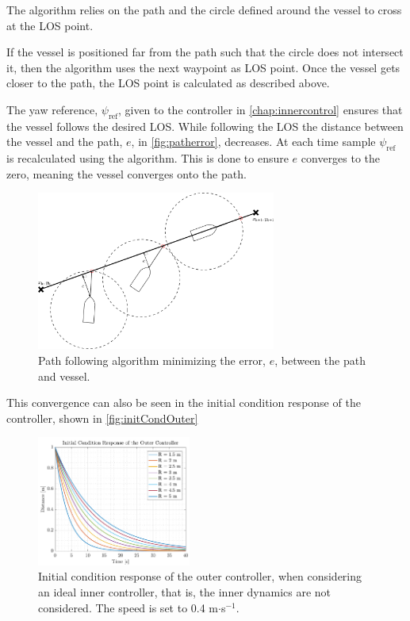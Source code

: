 The algorithm relies on the path and the circle defined around the vessel to cross at the LOS point. 

If the vessel is positioned far from the path such that the circle does not intersect it, then the algorithm uses the next waypoint as LOS point. Once the vessel gets closer to the path, the LOS point is calculated as described above.

The yaw reference, $\psi_\mathrm{ref}$, given to the controller in \autoref{chap:innercontrol} ensures that the vessel follows the desired LOS. While following the LOS the distance between the vessel and the path, $e$, in \autoref{fig:patherror}, decreases. At each time sample $\psi_\mathrm{ref}$ is recalculated using the algorithm. This is done to ensure $e$ converges to the zero, meaning the vessel converges onto the path.
%
\begin{figure}[H]
	\includegraphics[width=0.7\textwidth]{figures/patherror}
	\caption{Path following algorithm minimizing the error, $e$, between the path and vessel.}
	\label{fig:patherror}
\end{figure}
%

This convergence can also be seen in the initial condition response of the controller, shown in \autoref{fig:initCondOuter}
%
\begin{figure}[H]
    \includegraphics[width=0.45\textwidth]{figures/initCondOuter}
    \caption{Initial condition response of the outer controller, when considering an ideal inner controller, that is, the inner dynamics are not considered. The speed is set to \num{0.4} m$\cdot$s$^{-1}$.}
    \label{fig:initCondOuter}
\end{figure}

